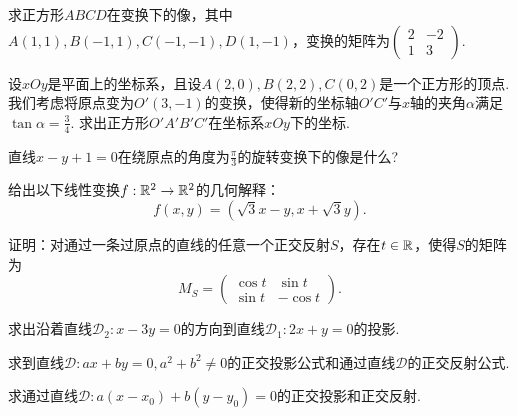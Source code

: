 \begin{problem}
  求正方形$ABCD$在变换下的像，其中$A(1,1),B(-1,1),C(-1,-1),D(1,-1)$，变换的矩阵为$\begin{pmatrix}
    2 & -2 \\
    1 & 3
  \end{pmatrix}$.
\end{problem}

\begin{problem}
  设$xOy$是平面上的坐标系，且设$A(2,0),B(2,2),C(0,2)$是一个正方形的顶点. 我们考虑将原点变为$O'(3,-1)$的变换，使得新的坐标轴$O'C'$与$x$轴的夹角$\alpha$满足$\tan\alpha=\frac34$. 求出正方形$O'A'B'C'$在坐标系$xOy$下的坐标.
\end{problem}

\begin{problem}
  直线$x-y+1=0$在绕原点的角度为$\frac\pi3$的旋转变换下的像是什么?
\end{problem}

\begin{problem}
  给出以下线性变换$f:\mathbb R^2\to\mathbb R^2$的几何解释：
  \[
    f(x,y) = ( \sqrt3x - y, x + \sqrt3y ).
  \]
\end{problem}

\begin{mybox}
  \begin{problem}[正交反射回顾.]

    证明：对通过一条过原点的直线的任意一个正交反射$S$，存在$t\in\mathbb R$，使得$S$的矩阵为
    \[
      M_S = \begin{pmatrix}
        \cos t & \sin t \\
        \sin t & -\cos t
      \end{pmatrix}.
    \]
  \end{problem}
\end{mybox}

\begin{problem}
  求出沿着直线$\mathscr D_2:x-3y=0$的方向到直线$\mathscr D_1:2x+y=0$的投影.
\end{problem}

\begin{mybox}
  \begin{problem}[正交投影和通过原点的一条直线的反射.]

    求到直线$\mathscr D:ax+by=0,a^2+b^2\ne0$的正交投影公式和通过直线$\mathscr D$的正交反射公式.
  \end{problem}
\end{mybox}

\begin{mybox}
  \begin{problem}[通过一个不过原点的直线的正交投影和反射.]

    求通过直线$\mathscr D:a(x-x_0)+b(y-y_0)=0$的正交投影和正交反射.
  \end{problem}
\end{mybox}

